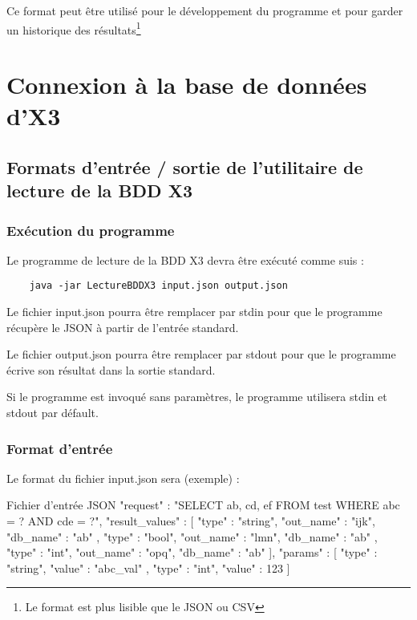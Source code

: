 {Ce format peut être utilisé pour le développement du programme et pour garder un historique des résultats\footnote{Le format est plus lisible que le JSON ou CSV}




\chapter{Connexion à la base de données d'X3}

\section{Formats d'entrée / sortie de l'utilitaire de lecture de la BDD X3}

\subsection{Exécution du programme}

Le programme de lecture de la BDD X3 devra être exécuté comme suis :

\begin{verbatim}
    java -jar LectureBDDX3 input.json output.json
\end{verbatim}

Le fichier input.json pourra être remplacer par stdin pour que le programme récupère le JSON à partir de l’entrée standard.

Le fichier output.json pourra être remplacer par stdout pour que le programme écrive son résultat dans la sortie standard.

Si le programme est invoqué sans paramètres, le programme utilisera stdin et stdout par défault.


\subsection{Format d'entrée}

Le format du fichier input.json sera (exemple) :

\begin{Python}{Fichier d'entrée JSON}
    {
        "request" :  "SELECT ab, cd, ef FROM test WHERE abc = ? AND cde = ?",
        "result_values" : [
            { "type" : "string", "out_name" : "ijk", "db_name" : "ab" },
            { "type" : "bool", "out_name" : "lmn", "db_name" : "ab" },
            { "type" : "int", "out_name" : "opq", "db_name" : "ab" }
        ],
        "params" :  [
            { "type" : "string", "value" : "abc_val" },
            { "type" : "int", "value" : 123 }
        ]
    }


\end{Python}}
